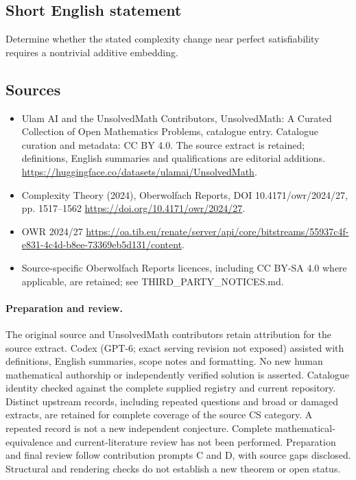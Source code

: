 \documentclass[11pt]{article}
\begin{document}
\subsection{Short English statement}
Determine whether the stated complexity change near perfect satisfiability requires a nontrivial additive embedding.
\subsection{Sources}
\begin{itemize}
\item[\hypertarget{source:statement:1}{S1}] Ulam AI and the UnsolvedMath Contributors, UnsolvedMath: A Curated Collection of Open Mathematics Problems, catalogue entry. Catalogue curation and metadata: CC BY 4.0. The source extract is retained; definitions, English summaries and qualifications are editorial additions.
\url{https://huggingface.co/datasets/ulamai/UnsolvedMath}.
\item[\hypertarget{source:statement:2}{S2}] Complexity Theory (2024), Oberwolfach Reports, DOI 10.4171/owr/2024/27, pp. 1517--1562
\url{https://doi.org/10.4171/owr/2024/27}.
\item[\hypertarget{source:statement:3}{S3}] OWR 2024/27
\url{https://oa.tib.eu/renate/server/api/core/bitstreams/55937c4f-e831-4c4d-b8ee-73369eb5d131/content}.
\item Source-specific Oberwolfach Reports licences, including CC BY-SA 4.0 where applicable, are retained; see THIRD\_PARTY\_NOTICES.md.
\end{itemize}
\paragraph{Preparation and review.}
The original source and UnsolvedMath contributors retain attribution for the source extract. Codex (GPT-6; exact serving revision not exposed) assisted with definitions, English summaries, scope notes and formatting. No new human mathematical authorship or independently verified solution is asserted. Catalogue identity checked against the complete supplied registry and current repository. Distinct upstream records, including repeated questions and broad or damaged extracts, are retained for complete coverage of the source CS category. A repeated record is not a new independent conjecture. Complete mathematical-equivalence and current-literature review has not been performed. Preparation and final review follow contribution prompts C and D, with source gaps disclosed. Structural and rendering checks do not establish a new theorem or open status.
\label{end:statement}
\end{document}
